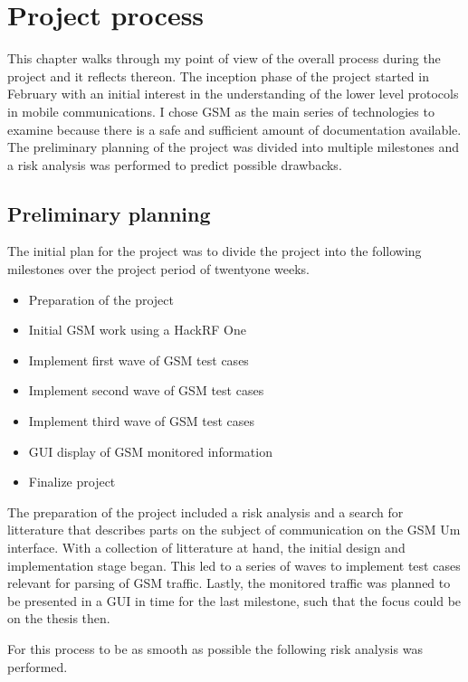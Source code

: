 \chapter{Project process}
This chapter walks through my point of view of the overall process
during the project and it reflects thereon. The inception phase of the
project started in February with an initial interest in the
understanding of the lower level protocols in mobile communications. I
chose \gls{GSM} as the main series of technologies to examine because
there is a safe and sufficient amount of documentation available. The
preliminary planning of the project was divided into multiple
milestones and a risk analysis was performed to predict possible
drawbacks.

\section{Preliminary planning}
The initial plan for the project was to divide the project into the
following milestones over the project period of twentyone weeks.

\begin{itemize}
\item Preparation of the project
\item Initial \gls{GSM} work using a HackRF One
\item Implement first wave of \gls{GSM} test cases
\item Implement second wave of \gls{GSM} test cases
\item Implement third wave of \gls{GSM} test cases
\item \gls{GUI} display of \gls{GSM} monitored information
\item Finalize project
\end{itemize}

The preparation of the project included a risk analysis and a search
for litterature that describes parts on the subject of communication
on the \gls{GSM} Um interface. With a collection of litterature at
hand, the initial design and implementation stage began. This led to a
series of waves to implement test cases relevant for parsing of
\gls{GSM} traffic. Lastly, the monitored traffic was planned to be
presented in a \gls{GUI} in time for the last milestone, such that the
focus could be on the thesis then.

For this process to be as smooth as possible the following risk
analysis was performed.

